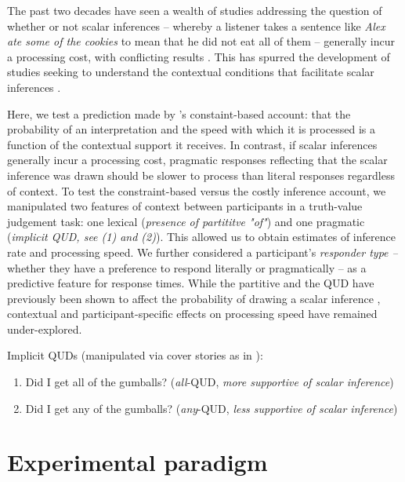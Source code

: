 \documentclass[10pt,letterpaper]{article}
\begin{document}
The past two decades have seen a wealth of studies addressing the question of whether or not scalar inferences -- whereby a listener takes a sentence like \textit{Alex ate some of the cookies} to mean that he did not eat all of them -- generally incur a processing cost, with conflicting results \cite{BottNoveck2004,HuangSnedeker2009,Grodner2010,Breheny2013,DegenTanenhaus2016}. This has spurred the development of studies seeking to understand the contextual conditions that facilitate scalar inferences \cite{Zondervan2010,Degen2015,Augurzky2019,MartyChemla2013,DegenGoodman2014}.

Here, we test a prediction made by 's constaint-based account: that the probability of an interpretation and the speed with which it is processed is a function of the contextual support it receives. In contrast, if scalar inferences generally incur a processing cost, pragmatic responses reflecting that the scalar inference was drawn should be slower to process than literal responses regardless of context. To test the constraint-based versus the costly inference account, we manipulated two features of context between participants in a truth-value judgement task: one lexical (\textit{presence of partititve "of"}) and one pragmatic (\textit{implicit QUD, see (1) and (2)}). This allowed us to obtain estimates of inference rate and processing speed. We further considered a participant’s \textit{responder type  --} whether they have a preference to respond literally or pragmatically -- as a predictive feature for response times. While the partitive and the QUD have previously been shown to affect the probability of drawing a scalar inference \cite{Zondervan2010,Degen2015,DegenGoodman2014,DegenTanenhaus2015}, contextual and participant-specific effects on processing speed have remained under-explored.

Implicit QUDs (manipulated via cover stories as in ):
\begin{enumerate}
  \item Did I get all of the gumballs? (\textit{all}-QUD, \textit{more supportive of scalar inference})
  \item Did I get any of the gumballs? (\textit{any}-QUD, \textit{less supportive of scalar inference})
\end{enumerate} 

\section{Experimental paradigm}
\end{document}
